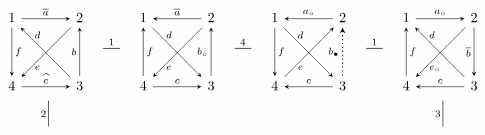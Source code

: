 \documentclass[11pt, letterpaper]{amsart}
\theoremstyle{definition}
\numberwithin{equation}{section}
\newcommand{\shortmutation}[1]{\stackrel{#1}{\rule[.5ex]{1.2em}{0.5pt}}}
\newcommand{\vmutation}[1]{  {\scriptstyle #1}{\Bigl|\Bigr.}  }
\begin{document}
\begin{figure}[ht]
\begin{equation*}
\hspace{-10pt}
\begin{array}{ccccccccc}

\begin{tikzcd}[arrows={-stealth}, sep=\sepps]
  1  \arrow[r,  "\overline{a}", -stealth] \arrow[dr, "d" near start, outer sep=\outsepd, stealth-]  \arrow[d, "f", -stealth]  
  & 2  \arrow[d, swap, "b", stealth-] \arrow[dl, "e", near end, outer sep=\outsepe, -stealth]
  \\
   4 
   & 3  \arrow[l, "\widehat{c}", swap, stealth-] 
\end{tikzcd}
 & \shortmutation{1}
 &
 \begin{tikzcd}[arrows={-stealth}, sep=\sepps]
  1  \arrow[r,  "\overline{a}", stealth-] \arrow[dr, "d" near start, outer sep=\outsepd, -stealth]  \arrow[d, "f", stealth-]  
  & 2  \arrow[d, swap, "b_\circ", stealth-] \arrow[dl, "e", near end, outer sep=\outsepe, -stealth]
  \\
   4 
   & 3  \arrow[l, "c", swap, \snsl] 
\end{tikzcd}
 & \shortmutation{4}
 & 
 
\begin{tikzcd}[arrows={-stealth}, sep=\sepps]
  1  \arrow[r,  "a_{\circ}", \snsl] \arrow[dr, "d" near start, outer sep=\outsepd, \snls]  \arrow[d, "f", \snls]  
  & 2  \arrow[d, swap, "b_\bullet", thick, dotted, \snsl] \arrow[dl, "e", near end, outer sep=\outsepe, \snsl]
  \\
   4 
   & 3  \arrow[l, "c", swap, \snls] 
\end{tikzcd}
 
 & \shortmutation{1}
 &
\begin{tikzcd}[arrows={-stealth}, sep=\sepps]
  1  \arrow[r,  "a_{\circ}", \snls] \arrow[dr, "d" near start, outer sep=\outsepd, \snsl]  \arrow[d, "f", \snsl]  
  & 2  \arrow[d, swap, "\overline{b}", \snls] \arrow[dl, "e_{\circ}", near end, outer sep=\outsepe, \snls]
  \\
   4 
   & 3  \arrow[l, "c", swap, \snls] 
\end{tikzcd}
\\
\\[-8pt]
\vmutation{2}   &\multicolumn{2}{c}{
\begin{aligned}
 \end{aligned}}&
  & & & \vmutation{3} \\[-6pt]
\\



\end{array}
\end{equation*}
\end{figure}
\end{document}
